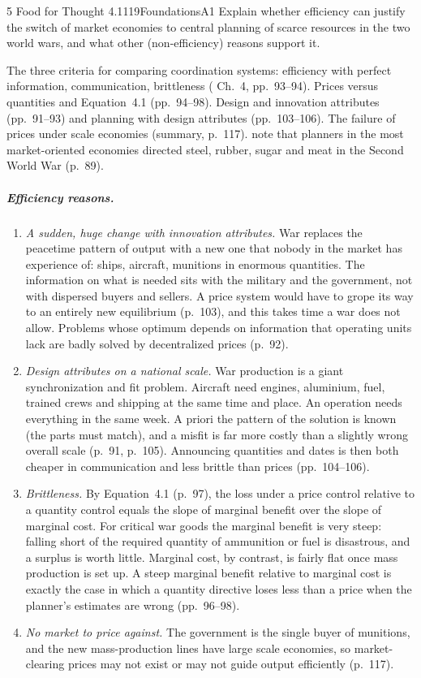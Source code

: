\begin{exsol}{5}{\MR{} Food for Thought 4.1}{119}{Foundations}{A1}
\asked Explain whether efficiency can justify the switch of market economies to central planning
of scarce resources in the two world wars, and what other (non-efficiency) reasons support it.

\method The three criteria for comparing coordination systems: efficiency with perfect
information, communication, brittleness (\MR{} Ch.~4, pp.~93--94). Prices versus quantities and
Equation~4.1 (pp.~94--98). Design and innovation attributes (pp.~91--93) and planning with design
attributes (pp.~103--106). The failure of prices under scale economies (summary, p.~117). \MR{}
note that planners in the most market-oriented economies directed steel, rubber, sugar and meat
in the Second World War (p.~89).

\solution
\subparagraph{Efficiency reasons.}
\begin{enumerate}[label=(\roman*)]
  \item \emph{A sudden, huge change with innovation attributes.} War replaces the peacetime
    pattern of output with a new one that nobody in the market has experience of: ships, aircraft,
    munitions in enormous quantities. The information on what is needed sits with the military
    and the government, not with dispersed buyers and sellers. A price system would have to grope
    its way to an entirely new equilibrium (p.~103), and this takes time a war does not allow.
    Problems whose optimum depends on information that operating units lack are badly solved by
    decentralized prices (p.~92).
  \item \emph{Design attributes on a national scale.} War production is a giant synchronization
    and fit problem. Aircraft need engines, aluminium, fuel, trained crews and shipping at the
    same time and place. An operation needs everything in the same week. A priori the pattern of
    the solution is known (the parts must match), and a misfit is far more costly than a
    slightly wrong overall scale (p.~91, p.~105). Announcing quantities and dates is then both
    cheaper in communication and less brittle than prices (pp.~104--106).
  \item \emph{Brittleness.} By Equation~4.1 (p.~97), the loss under a price control relative to a
    quantity control equals the slope of marginal benefit over the slope of marginal cost. For
    critical war goods the marginal benefit is very steep: falling short of the required quantity
    of ammunition or fuel is disastrous, and a surplus is worth little. Marginal cost, by contrast,
    is fairly flat once mass production is set up. A steep marginal benefit relative to marginal
    cost is exactly the case in which a quantity directive loses less than a price when the
    planner's estimates are wrong (pp.~96--98).
  \item \emph{No market to price against.} The government is the single buyer of munitions, and
    the new mass-production lines have large scale economies, so market-clearing prices may not
    exist or may not guide output efficiently (p.~117).
\end{enumerate}


\end{exsol}
